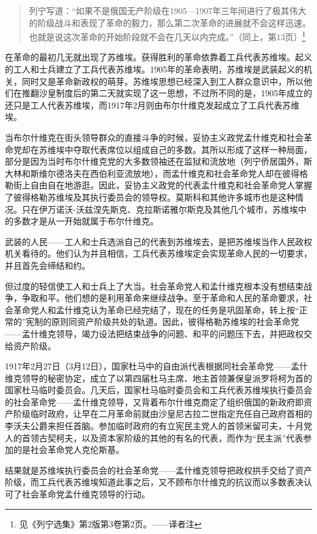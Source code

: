 \begin{quotation}
列宁写道：“如果不是俄国无产阶级在1905—1907年三年间进行了极其伟大的阶级战斗和表现了革命的毅力，那么第二次革命的进展就不会这样迅速。也就是说这次革命的开始阶段就不会在几天以内完成。”（同上，第13页）\footnote{见《列宁选集》第2版第3卷第2页。——译者注}
\end{quotation}

在革命的最初几无就出现了苏维埃。获得胜利的革命依靠着工兵代表苏维埃。起义的工人和士兵建立了工兵代表苏维埃。1905年的革命表明，苏维埃是武装起义的机关，同时又是革命新政权的萌芽。苏维埃思想已经深入到工人群众意识中，所以他们在推翻沙皇制度后的第二天就实现了这一思想，不过所不同的是，1905年成立的还只是工人代表苏维埃，而1917年2月则由布尔什维克发起成立了工兵代表苏维埃。

当布尔什维克在街头领导群众的直接斗争的时候，妥协主义政党孟什维克和社会革命党却在苏维埃中夺取代表席位以组成自己的多数。其所以形成了这样一种局面，部分是因为当时布尔什维克党的大多数领袖还在监狱和流放地（列宁侨居国外，斯大林和斯维尔德洛夫在西伯利亚流放地），而孟什维克和社会革命党人却在彼得格勒街上自由自在地游逛。因此，妥协主义政党的代表孟什维克和社会革命党人掌握了彼得格勒苏维埃及其执行委员会的领导权。莫斯科和其他许多城市也是这种情况。只在伊万诺沃-沃兹涅先斯克、克拉斯诺雅尔斯克及其他几个城市，苏维埃中的多数才是从一开始就属于布尔什维克。

武装的人民——工人和士兵选派自己的代表到苏维埃去，是把苏维埃当作人民政权机关看待的。他们认为并且相信，工兵代表苏维埃定会实现革命人民的一切要求，并且首先会缔结和约。

但过度的轻信使工人和士兵上了大当。社会革命党人和孟什维克根本没有想结束战争，争取和平。他们想的是利用革命来继续战争。至于革命和人民的革命要求，社会革命党人和孟什维克认为革命已经完结了，现在的任务是巩固革命，转上按“正常的”宪制的原则同资产阶级共处的轨道。因此，彼得格勒苏维埃的社会革命党——孟什维克领导，竭力设法把结束战争的问题、和平的问题压下去，并把政权交给资产阶级。

1917年2月27日（3月12日），国家杜马中的自由派代表根据同社会革命党——孟什维克领导的秘密协定，成立了以第四届杜马主席、地主首领兼保皇派罗将柯为首的国家杜马临时委员会。几天后，国家杜马临时委员会和工兵代表苏维埃执行委员会的社会革命党——孟什维克领导，又背着布尔什维克商定了组织俄国的新政府即资产阶级临时政府，让早在二月革命前就由沙皇尼古拉二世指定充任自己政府首相的李沃夫公爵来担任首脑。参加临时政府的有立宪民主党人的首领米留可夫，十月党人的首领古契柯夫，以及资本家阶级的其他的有名的代表，而作为“民主派”代表参加的是社会革命党人克伦斯基。

结果就是苏维埃执行委员会的社会革命党——孟什维克领导把政权拱手交给了资产阶级，而工兵代表苏维埃知道此事之后，又不顾布尔什维克的抗议而以多数表决认可了社会革命党孟什维克领导的行动。


